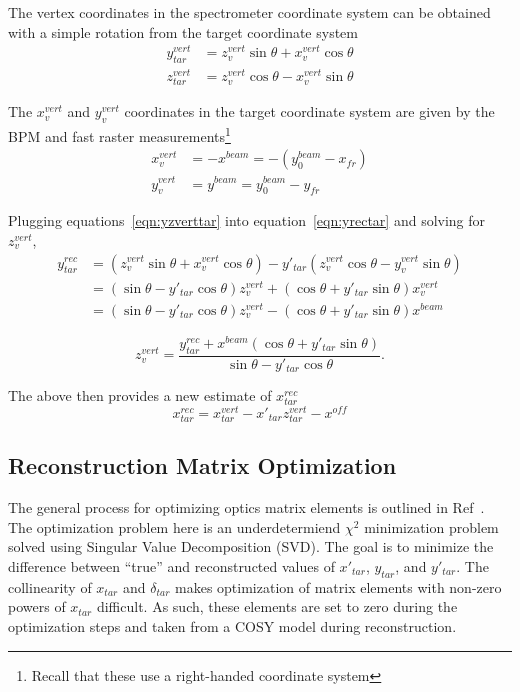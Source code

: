 The vertex coordinates in the spectrometer coordinate system can be obtained
with a simple rotation from the target coordinate system
\begin{align} \label{eqn:yzverttar}
    y^{vert}_{tar} &= z^{vert}_v \sin\theta + x^{vert}_v \cos\theta \\
    z^{vert}_{tar} &= z^{vert}_v \cos\theta - x^{vert}_v \sin\theta
\end{align}

The $x^{vert}_{v}$ and $y^{vert}_{v}$ coordinates in the
target coordinate system are given by the BPM and fast raster
measurements\footnote{Recall that these use a right-handed coordinate system}
\begin{align}
    x^{vert}_v &= -x^{beam} = -(y_0^{beam} - x_{fr}) \\
    y^{vert}_v &= y^{beam} = y_0^{beam} - y_{fr}
\end{align}

Plugging equations~\ref{eqn:yzverttar} into equation~\ref{eqn:yrectar} and
solving for $z^{vert}_v$,
\begin{align}
    y^{rec}_{tar} &= (z^{vert}_v \sin\theta + x^{vert}_v \cos\theta) -
                     y'_{tar} (z^{vert}_v \cos\theta - y^{vert}_v \sin\theta) \\
                  &= (\sin\theta-y'_{tar}\cos\theta)z^{vert}_v +
                     (\cos\theta + y'_{tar} \sin\theta) x^{vert}_v \\
                  &= (\sin\theta-y'_{tar}\cos\theta)z^{vert}_v -
                     (\cos\theta + y'_{tar} \sin\theta) x^{beam}
\end{align}

\begin{equation}
    z^{vert}_v = \frac{y^{rec}_{tar} + x^{beam} (\cos\theta + y'_{tar} \sin\theta)}
                      {\sin\theta - y'_{tar}\cos\theta}.
\end{equation}

The above then provides a new estimate of $x^{rec}_{tar}$
\begin{equation}
    x^{rec}_{tar} = x^{vert}_{tar} - x'_{tar}z^{vert}_{tar} - x^{off}
\end{equation}

\subsection{Reconstruction Matrix Optimization}
The general process for optimizing optics matrix elements is outlined in
Ref~\cite{Bericic_2017}.
The optimization problem here is an underdetermiend $\chi^2$ minimization
problem solved using Singular Value Decomposition (SVD).
The goal is to minimize the difference between ``true'' and reconstructed
values of $x'_{tar}$, $y_{tar}$, and $y'_{tar}$.
The collinearity of $x_{tar}$ and $\delta_{tar}$ makes optimization of matrix
elements with non-zero powers of $x_{tar}$ difficult.
As such, these elements are set to zero during the optimization steps and taken
from a COSY model during reconstruction.


